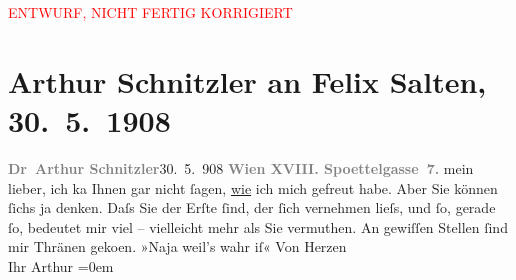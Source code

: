 
\begin{center}
            \textcolor{red}{ENTWURF, NICHT FERTIG KORRIGIERT}
                      \end{center}
            
         
         \renewcommand{\erwaehntePersonen}{Personen: Felix Salten}
         \renewcommand{\erwaehnteOrte}{Orte: Edmund-Weiß-Gasse, Wien}
         \renewcommand{\erwaehnteWerke}{}
               \section[Arthur Schnitzler an Felix Salten, 30. 5. 1908]{ Arthur Schnitzler an Felix Salten, 30. 5. 1908}\nopagebreak{}\rehead{ }\begin{ledgroupsized}[t]{13cm}\normalsize\beginnumbering \toendnotes[C]{\smallbreak\pagebreak[2]} 
\pstart
           \noindent{}{\pb}\textcolor{gray}{\textbf{Dr Arthur Schnitzler}}\hfill 30. 5. 908\pend
           \pstart
           \textcolor{gray}{\textbf{Wien XVIII. Spoettelgasse 7.}}\pend
           \pstart
           mein lieber, ich ka{\geminationn} Ihnen gar nicht
               ſagen, \uline{wie} ich mich gefreut habe. Aber Sie können
               ſichs ja denken. Daſs Sie der Erſte ſind, der ſich vernehmen lieſs, und ſo, gerade
               ſo, bedeutet mir {\pb}viel – vielleicht mehr als
               Sie vermuthen. An gewiſſen Stellen ſind mir Thränen geko{\geminationm}en. »Naja {\dotstwo} weil’s wahr iſ{\dotstwo}« \pend
           \pstart
           Von Herzen {\\[\baselineskip]}Ihr \spacefill\mbox{Arthur}\pend
           \leftskip=0em{}
         
         \endnumbering{}\end{ledgroupsized}\begin{anhang}\end{anhang}\newcommand{\dateiname}{L03012}\newcommand{\titel}{Arthur Schnitzler an Felix Salten, 30. 5. 1908}\newcommand{\editorInnen}{Martin Anton Müller und Laura Untner}
      